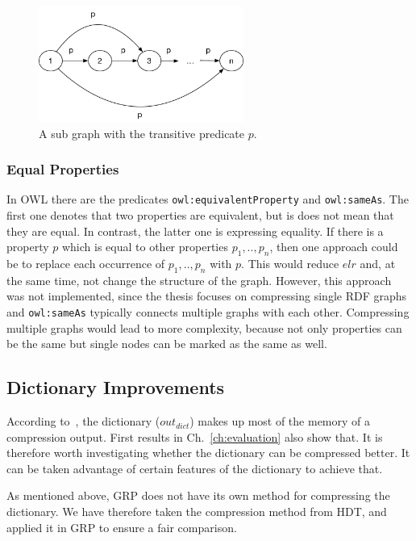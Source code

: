 \begin{figure}[h]
	\centering
	\includegraphics[width=0.6\textwidth]{figures/approach/transitiveMat}
	\caption{A sub graph with the transitive predicate $p$.}
	\label{fig:transitiveMat}
\end{figure}


\subsubsection{Equal Properties}

In OWL there are the predicates {\tt owl:equivalentProperty} and {\tt owl:sameAs}. The first one denotes that two properties are equivalent, but is does not mean that they are equal. In contrast, the latter one is expressing equality. If there is a property $p$ which is equal to other properties $p_1,..,p_n$, then one approach could be to replace each occurrence of $p_1,..,p_n$ with $p$. This would reduce $elr$ and, at the same time, not change the structure of the graph. However, this approach was not implemented, since the thesis focuses on compressing single RDF graphs and {\tt owl:sameAs} typically connects multiple graphs with each other. Compressing multiple graphs would lead to more complexity, because not only properties can be the same but single nodes can be marked as the same as well.




\subsection{Dictionary Improvements}\label{sec:approachDictImprovements}


According to~\cite{hdt}, the dictionary ($out_{dict}$) makes up most of the memory of a compression output. First results in Ch.~\ref{ch:evaluation} also show that. It is therefore worth investigating whether the dictionary can be compressed better. It can be taken advantage of certain features of the dictionary to achieve that.

As mentioned above, GRP does not have its own method for compressing the dictionary. We have therefore taken the compression method from HDT, and applied it in GRP to ensure a fair comparison.


